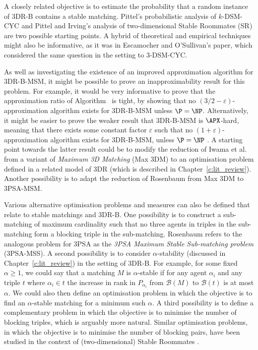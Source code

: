 A closely related objective is to estimate the probability that a random instance of 3DR-B contains a stable matching. Pittel's \cite{Pittel20} probabilistic analysis of $k$-DSM-CYC and Pittel and Irving's \cite{PI94} analysis of two-dimensional Stable Roommates (SR) are two possible starting points. A hybrid of theoretical and empirical techniques might also be informative, as it was in Escamocher and O'Sullivan's \cite{Escamocher2018} paper, which considered the same question in the setting to 3-DSM-CYC.

As well as investigating the existence of an improved approximation algorithm for 3DR-B-MSM, it might be possible to prove an inapproximability result for this problem. For example, it would be very informative to prove that the approximation ratio of Algorithm~ is tight, by showing that no $(3/2 - \varepsilon)$-approximation algorithm exists for 3DR-B-MSM unless $\P = \NP$. Alternatively, it might be easier to prove the weaker result that 3DR-B-MSM is $\APX$-hard, meaning that there exists some constant factor $\varepsilon$ such that no $(1 + \varepsilon)$-approximation algorithm exists for 3DR-B-MSM, unless $\P = \NP$ \cite{ACGKMP99}. A starting point towards the latter result could be to modify the reduction of Iwama et al.\ \cite{IMO08} from a variant of \emph{Maximum 3D Matching} (Max 3DM) to an optimisation problem defined in a related model of 3DR (which is described in Chapter~\ref{c:lit_review}). Another possibility is to adapt the reduction of Rosenbaum \cite{rosenbaum16} from Max 3DM to 3PSA-MSM.

Various alternative optimisation problems and measures can also be defined that relate to stable matchings and 3DR-B.
One possibility is to construct a sub-matching of maximum cardinality such that no three agents in triples in the sub-matching form a blocking triple in the sub-matching. Rosenbaum \cite{rosenbaum16} refers to the analogous problem for 3PSA as the \emph{3PSA Maximum Stable Sub-matching problem} (3PSA-MSS). 
A second possibility is to consider $\alpha$-stability \cite{ABEOMP09} (discussed in Chapter~\ref{c:lit_review}) in the setting of 3DR-B. For example, for some fixed $\alpha \geq 1$, we could say that a matching $M$ is $\alpha$-stable if for any agent $\alpha_i$ and any triple $t$ where $\alpha_i \in t$ the increase in rank in $P_{\alpha_i}$ from $\mathscr{B}(M)$ to $\mathscr{B}(t)$ is at most $\alpha$. We could also then define an optimisation problem in which the objective is to find an $\alpha$-stable matching for a minimum such $\alpha$.
A third possibility is to define a complementary problem in which the objective is to minimise the number of blocking triples, which is arguably more natural. Similar optimisation problems, in which the objective is to minimise the number of blocking pairs, have been studied in the context of (two-dimensional) Stable Roommates \cite{ABM06}. %

